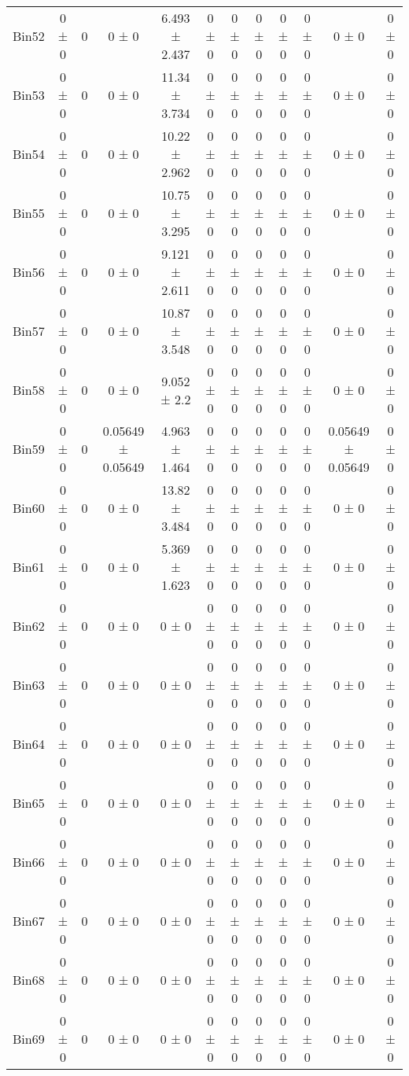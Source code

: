\begin{tabular}{@{\extracolsep{4pt}}lccccccccccc@{}}
     Bin52 & 0 ± 0 & 0 & 0 ± 0 & 6.493 ± 2.437 & 0 ± 0 & 0 ± 0 & 0 ± 0 & 0 ± 0 & 0 ± 0 & 0 ± 0 & 0 ± 0 \\ 
     Bin53 & 0 ± 0 & 0 & 0 ± 0 & 11.34 ± 3.734 & 0 ± 0 & 0 ± 0 & 0 ± 0 & 0 ± 0 & 0 ± 0 & 0 ± 0 & 0 ± 0 \\ 
     Bin54 & 0 ± 0 & 0 & 0 ± 0 & 10.22 ± 2.962 & 0 ± 0 & 0 ± 0 & 0 ± 0 & 0 ± 0 & 0 ± 0 & 0 ± 0 & 0 ± 0 \\ 
     Bin55 & 0 ± 0 & 0 & 0 ± 0 & 10.75 ± 3.295 & 0 ± 0 & 0 ± 0 & 0 ± 0 & 0 ± 0 & 0 ± 0 & 0 ± 0 & 0 ± 0 \\ 
     Bin56 & 0 ± 0 & 0 & 0 ± 0 & 9.121 ± 2.611 & 0 ± 0 & 0 ± 0 & 0 ± 0 & 0 ± 0 & 0 ± 0 & 0 ± 0 & 0 ± 0 \\ 
     Bin57 & 0 ± 0 & 0 & 0 ± 0 & 10.87 ± 3.548 & 0 ± 0 & 0 ± 0 & 0 ± 0 & 0 ± 0 & 0 ± 0 & 0 ± 0 & 0 ± 0 \\ 
     Bin58 & 0 ± 0 & 0 & 0 ± 0 & 9.052 ± 2.2 & 0 ± 0 & 0 ± 0 & 0 ± 0 & 0 ± 0 & 0 ± 0 & 0 ± 0 & 0 ± 0 \\ 
     Bin59 & 0 ± 0 & 0 & 0.05649 ± 0.05649 & 4.963 ± 1.464 & 0 ± 0 & 0 ± 0 & 0 ± 0 & 0 ± 0 & 0 ± 0 & 0.05649 ± 0.05649 & 0 ± 0 \\ 
     Bin60 & 0 ± 0 & 0 & 0 ± 0 & 13.82 ± 3.484 & 0 ± 0 & 0 ± 0 & 0 ± 0 & 0 ± 0 & 0 ± 0 & 0 ± 0 & 0 ± 0 \\ 
     Bin61 & 0 ± 0 & 0 & 0 ± 0 & 5.369 ± 1.623 & 0 ± 0 & 0 ± 0 & 0 ± 0 & 0 ± 0 & 0 ± 0 & 0 ± 0 & 0 ± 0 \\ 
     Bin62 & 0 ± 0 & 0 & 0 ± 0 & 0 ± 0 & 0 ± 0 & 0 ± 0 & 0 ± 0 & 0 ± 0 & 0 ± 0 & 0 ± 0 & 0 ± 0 \\ 
     Bin63 & 0 ± 0 & 0 & 0 ± 0 & 0 ± 0 & 0 ± 0 & 0 ± 0 & 0 ± 0 & 0 ± 0 & 0 ± 0 & 0 ± 0 & 0 ± 0 \\ 
     Bin64 & 0 ± 0 & 0 & 0 ± 0 & 0 ± 0 & 0 ± 0 & 0 ± 0 & 0 ± 0 & 0 ± 0 & 0 ± 0 & 0 ± 0 & 0 ± 0 \\ 
     Bin65 & 0 ± 0 & 0 & 0 ± 0 & 0 ± 0 & 0 ± 0 & 0 ± 0 & 0 ± 0 & 0 ± 0 & 0 ± 0 & 0 ± 0 & 0 ± 0 \\ 
     Bin66 & 0 ± 0 & 0 & 0 ± 0 & 0 ± 0 & 0 ± 0 & 0 ± 0 & 0 ± 0 & 0 ± 0 & 0 ± 0 & 0 ± 0 & 0 ± 0 \\ 
     Bin67 & 0 ± 0 & 0 & 0 ± 0 & 0 ± 0 & 0 ± 0 & 0 ± 0 & 0 ± 0 & 0 ± 0 & 0 ± 0 & 0 ± 0 & 0 ± 0 \\ 
     Bin68 & 0 ± 0 & 0 & 0 ± 0 & 0 ± 0 & 0 ± 0 & 0 ± 0 & 0 ± 0 & 0 ± 0 & 0 ± 0 & 0 ± 0 & 0 ± 0 \\ 
     Bin69 & 0 ± 0 & 0 & 0 ± 0 & 0 ± 0 & 0 ± 0 & 0 ± 0 & 0 ± 0 & 0 ± 0 & 0 ± 0 & 0 ± 0 & 0 ± 0 \\ 

\end{tabular}

